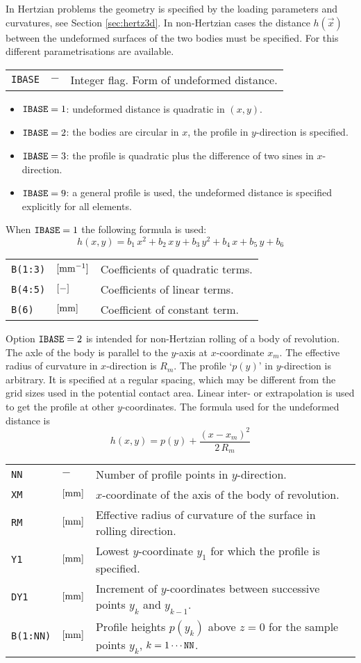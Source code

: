 \documentclass[12pt]{report}
\newenvironment{inputvars}{\vspace{0.4\baselineskip}%

\begin{tabular}{>{\raggedright}p{22mm}p{19mm}p{113mm}}}{
\end{tabular}

}
\newcommand{\inpvar}[3]{{\small\tt #1} & $#2$ & #3 \\[1ex]}
\begin{document}
In Hertzian problems the geometry is specified by the loading parameters
and curvatures, see Section \ref{sec:hertz3d}. In non-Hertzian cases the
distance $h(\vec{x})$ between the undeformed surfaces of the two bodies must
be specified. For this different parametrisations are available.
\begin{inputvars}
\inpvar{IBASE}{-}{Integer flag. Form of undeformed distance.}
\end{inputvars}
\vspace{-2ex}
\begin{itemize}
\item ${\tt IBASE}=1$: undeformed distance is quadratic in $(x,y)$.
\item ${\tt IBASE}=2$: the bodies are circular in $x$, the profile in
        $y$-direction is specified.
\item ${\tt IBASE}=3$: the profile is quadratic plus the difference of two
        sines in $x$-direction.
\item ${\tt IBASE}=9$: a general profile is used, the undeformed distance
        is specified explicitly for all elements.
\end{itemize}
\label{itm:ibase1}When ${\tt IBASE}=1$ the following formula is used:
\begin{equation}\label{eq:quadr_ud}
  h(x,y) = b_1 \, x^2 + b_2 \, x \, y + b_3 \, y^2 + b_4 \, x + b_5 \, y + b_6
\end{equation}
\vspace{-3ex}
\begin{inputvars}
\inpvar{B(1:3)}{\bunit{mm^{-1}}}{Coefficients of quadratic terms.}
\inpvar{B(4:5)}{\bunit{-}}{Coefficients of linear terms.}
\inpvar{B(6)}{\bunit{mm}}{Coefficient of constant term.}
\end{inputvars}
\label{itm:ibase2}Option ${\tt IBASE}=2$ is intended for non-Hertzian
rolling of a body of revolution. The axle of the body is parallel to the
$y$-axis at $x$-coordinate $x_m$. The effective radius of curvature in
$x$-direction is $R_m$. The profile `$p(y)$' in $y$-direction is arbitrary.
It is specified at a regular spacing, which may be different from the
grid sizes used in the potential contact area. Linear inter- or
extrapolation is used to get the profile at other $y$-coordinates.
The formula used for the undeformed distance is
\begin{equation}\label{eq:circ_x_ud}
  h(x,y) = p(y) + \frac{(x-x_m)^2}{2\,R_m}
\end{equation}
\begin{inputvars}
\inpvar{NN}{-}{Number of profile points in $y$-direction.}
\inpvar{XM}{\bunit{mm}}{$x$-coordinate of the axis of the body of revolution.}
\inpvar{RM}{\bunit{mm}}{Effective radius of curvature of the surface in rolling
        direction.}
\inpvar{Y1}{\bunit{mm}}{Lowest $y$-coordinate $y_1$ for which the profile is
        specified.}
\inpvar{DY1}{\bunit{mm}}{Increment of $y$-coordinates between successive points
        $y_k$ and $y_{k-1}$.}
\inpvar{B(1:NN)}{\bunit{mm}}{Profile heights $p(y_k)$ above $z=0$ for the sample
        points $y_k$, $k=1\cdots{\tt NN}$.}
\end{inputvars}
\end{document}
